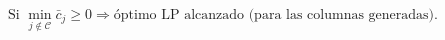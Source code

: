 \documentclass[preview]{standalone}
\begin{document}
\begin{align*}
\text{Si }\min_{j\notin\mathcal{C}}\bar{c}_j \ge 0 \Rightarrow \text{óptimo LP alcanzado (para las columnas generadas).}
\end{align*}
\end{document}
